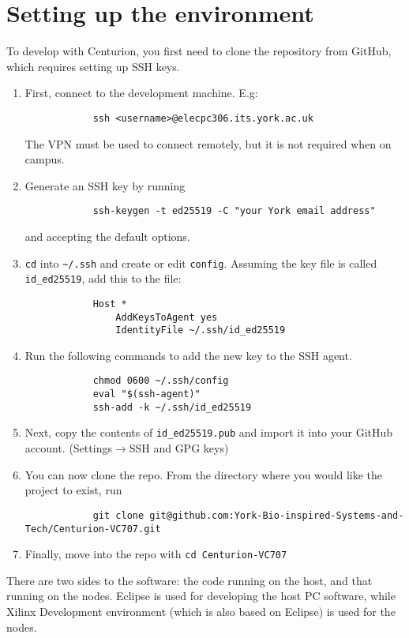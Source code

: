 \documentclass{article}
\begin{document}
	
	\section{Setting up the environment}
	To develop with Centurion, you first need to clone the repository from GitHub, which requires setting up SSH keys.
	\begin{enumerate}
		\item First, connect to the development machine. E.g:
			\begin{verbatim}
			ssh <username>@elecpc306.its.york.ac.uk
			\end{verbatim}
			The VPN must be used to connect remotely, but it is not required when on campus.
		\item Generate an SSH key by running
			\begin{verbatim}
			ssh-keygen -t ed25519 -C "your York email address"
			\end{verbatim}
		and accepting the default options.
		\item \verb|cd| into \verb|~/.ssh| and create or edit \verb|config|. Assuming the key file is called \verb|id_ed25519|, add this to the file:
			\begin{verbatim}
			Host *
			    AddKeysToAgent yes
			    IdentityFile ~/.ssh/id_ed25519
			\end{verbatim}
		\item Run the following commands to add the new key to the SSH agent.
			\begin{verbatim}
			chmod 0600 ~/.ssh/config
			eval "$(ssh-agent)"
			ssh-add -k ~/.ssh/id_ed25519
			\end{verbatim}
		\item Next, copy the contents of \verb|id_ed25519.pub| and import it into your GitHub account. (Settings$\rightarrow$SSH and GPG keys)
		\item You can now clone the repo. From the directory where you would like the project to exist, run
			\begin{verbatim}
			git clone git@github.com:York-Bio-inspired-Systems-and-Tech/Centurion-VC707.git
			\end{verbatim}
		\item Finally, move into the repo with \verb|cd Centurion-VC707|
	\end{enumerate}

	There are two sides to the software: the code running on the host, and that running on the nodes. Eclipse is used for developing the host PC software, while Xilinx Development environment (which is also based on Eclipse) is used for the nodes.
	
\end{document}
